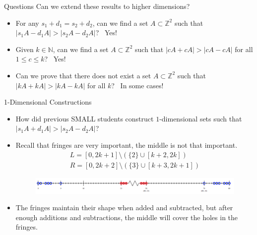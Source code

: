 \documentclass[11pt]{beamer}
\newcommand{\Z}{\mathbb{Z}}
\newcommand{\N}{\mathbb{N}}
\begin{document}

\begin{frame}{Questions}
Can we extend these results to higher dimensions?

\pause
\bigskip

\begin{itemize}
    \item For any $s_1+d_1=s_2+d_2$, can we find a set $A \subset \Z^2$ such that $|s_1A-d_1A|>|s_2A-d_2A|$? \pause\ \alert{Yes!}
    
    \pause
    \medskip
    
    \item Given $k \in \N$, can we find a set $A\subset \Z^2$ such that $|cA+cA|>|cA-cA|$ for all $1\leq c \leq k$?  \pause\ \alert{Yes!}
    
    \pause
    \medskip
    
    \item Can we prove that there does not exist a set $A \subset \Z^2$ such that $|kA+kA|>|kA-kA|$ for all $k$? \pause\ \alert{In some cases!}
\end{itemize}

\end{frame}


\begin{frame}{1-Dimensional Constructions}
\begin{itemize}
    \item How did previous SMALL students construct $1$-dimensional sets such that $|s_1A+d_1A|>|s_2A-d_2A|$?
    
    \pause
    \medskip

    \item Recall that fringes are very important, the middle is not that important.
    \pause
    \begin{gather*}
    L=[0, 2k+1] \setminus (\{2\} \cup [k+2, 2k])\\
    R=[0, 2k+2] \setminus (\{3\}\cup [k+3, 2k+1])
    \end{gather*}

    \pause
    \begin{figure}
        \centering
        \includegraphics[scale=.7]{middle_colored.png}
        \label{fig:middle}
    \end{figure}
    \pause

    \item The fringes maintain their shape when added and subtracted, but after enough additions and subtractions, the middle will cover the holes in the fringes.
\end{itemize}

\end{frame}
\end{document}
